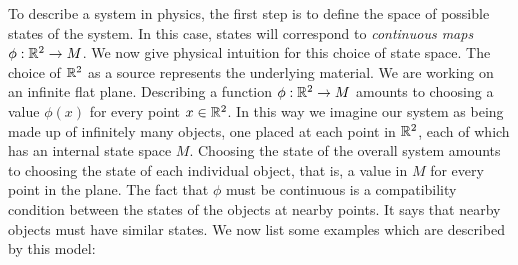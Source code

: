 To describe a system in physics, the first step is to define the space of possible states of the system. In this case, states will correspond to \textit{continuous maps $\phi: \mathbb{R}^2\to M$}. We now give physical intuition for this choice of state space. The choice of $\mathbb{R}^2$ as a source represents the underlying material. We are working on an infinite flat plane. Describing a function $\phi: \mathbb{R}^2\to M$ amounts to choosing a value $\phi(x)$ for every point $x\in \mathbb{R}^2$. In this way we imagine our system as being made up of infinitely many objects, one placed at each point in $\mathbb{R}^2$, each of which has an internal state space $M$. Choosing the state of the overall system amounts to choosing the state of each individual object, that is, a value in $M$ for every point in the plane. The fact that $\phi$ must be continuous is a compatibility condition between the states of the objects at nearby points. It says that nearby objects must have similar states. We now list some examples which are described by this model:

